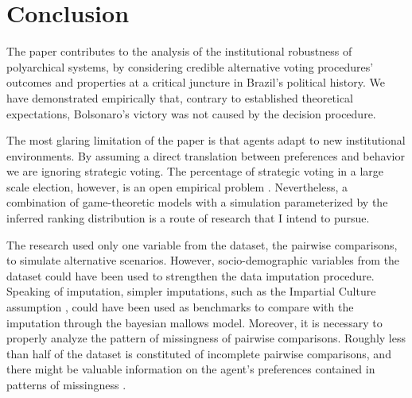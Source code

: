 \documentclass[hidelinks,11pt]{article}
\begin{document}
\section{Conclusion}

The paper contributes to the analysis of the institutional robustness of
polyarchical systems, by considering credible alternative voting procedures'
outcomes and properties at a critical juncture in Brazil's political history. We
have demonstrated empirically that, contrary to established
theoretical expectations, Bolsonaro's victory was not caused by the decision
procedure.

The most glaring limitation of the paper is that agents adapt to new
institutional environments. By assuming a direct
translation between preferences and behavior we are ignoring strategic voting.
The percentage of strategic voting in a large scale election, however, is an
open empirical problem \parencite{straeten10_strat_sincer_heuris_votin_under,kawai2013inferring}. Nevertheless, a
combination of game-theoretic models with a simulation parameterized by the
inferred ranking distribution is a route of research that I intend to pursue.

The research used only one variable from the dataset, the pairwise
comparisons, to simulate alternative scenarios. However, socio-demographic
variables from the dataset could have been used to strengthen the data
imputation procedure. Speaking of imputation, simpler imputations, such as the
Impartial Culture assumption \parencite{regenwetter2006behavioral}, could have been
used as benchmarks to compare with the imputation through the bayesian mallows
model. Moreover, it is necessary to properly analyze the pattern of missingness
of pairwise comparisons. Roughly less than half of the dataset is constituted of
incomplete pairwise comparisons, and there might be valuable information on the
agent's preferences contained in patterns of missingness
\parencite{mcelreath2020statistical}.
\end{document}
